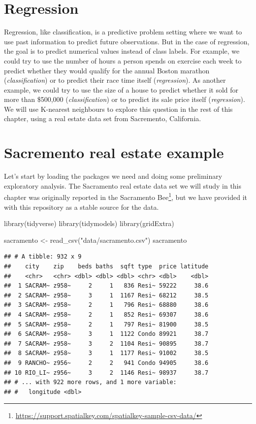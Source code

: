 \documentclass[
]{krantz}
\makeatletter
\newenvironment{Shaded}{\begin{snugshade}}{\end{snugshade}}
\newcommand{\FunctionTok}[1]{\textcolor[rgb]{0,0,0}{#1}}
\newcommand{\NormalTok}[1]{#1}
\newcommand{\OtherTok}[1]{\textcolor[rgb]{0.37,0.37,0.37}{#1}}
\newcommand{\StringTok}[1]{\textcolor[rgb]{0.5,0.5,0.5}{#1}}
\renewcommand{\href}[2]{#2\footnote{\url{#1}}}
\newenvironment{kframe}{%
\medskip{}
\setlength{\fboxsep}{.8em}
 \def\at@end@of@kframe{}%
 \ifinner\ifhmode%
  \def\at@end@of@kframe{\end{minipage}}%
  \begin{minipage}{\columnwidth}%
 \fi\fi%
 \def\FrameCommand##1{\hskip\@totalleftmargin \hskip-\fboxsep
 \colorbox{shadecolor}{##1}\hskip-\fboxsep
     \hskip-\linewidth \hskip-\@totalleftmargin \hskip\columnwidth}%
 \MakeFramed {\advance\hsize-\width
   \@totalleftmargin\z@ \linewidth\hsize
   \@setminipage}}%
 {\par\unskip\endMakeFramed%
 \at@end@of@kframe}
\renewenvironment{Shaded}{\begin{kframe}}{\end{kframe}}
\makeatother
\begin{document}
\hypertarget{regression}{%
\section{Regression}\label{regression}}

Regression, like classification, is a predictive problem setting where we want
to use past information to predict future observations. But in the case of
regression, the goal is to predict numerical values instead of class labels.
For example, we could try to use the number of hours a person spends on
exercise each week to predict whether they would qualify for the annual Boston
marathon (\emph{classification}) or to predict their race time itself
(\emph{regression}). As another example, we could try to use the size of a house to
predict whether it sold for more than \$500,000 (\emph{classification}) or to
predict its sale price itself (\emph{regression}). We will use K-nearest neighbours
to explore this question in the rest of this chapter, using a real estate data
set from Sacremento, California.

\hypertarget{sacremento-real-estate-example}{%
\section{Sacremento real estate example}\label{sacremento-real-estate-example}}

Let's start by loading the packages we need and doing some preliminary
exploratory analysis. The Sacramento real estate data set we will study in this chapter
was \href{https://support.spatialkey.com/spatialkey-sample-csv-data/}{originally reported in the Sacramento Bee},
but we have provided it with this repository as a stable source for the data.

\begin{Shaded}
\begin{Highlighting}[]
\FunctionTok{library}\NormalTok{(tidyverse)}
\FunctionTok{library}\NormalTok{(tidymodels)}
\FunctionTok{library}\NormalTok{(gridExtra)}

\NormalTok{sacramento }\OtherTok{\textless{}{-}} \FunctionTok{read\_csv}\NormalTok{(}\StringTok{"data/sacramento.csv"}\NormalTok{)}
\NormalTok{sacramento}
\end{Highlighting}
\end{Shaded}

\begin{verbatim}
## # A tibble: 932 x 9
##    city    zip    beds baths  sqft type  price latitude
##    <chr>   <chr> <dbl> <dbl> <dbl> <chr> <dbl>    <dbl>
##  1 SACRAM~ z958~     2     1   836 Resi~ 59222     38.6
##  2 SACRAM~ z958~     3     1  1167 Resi~ 68212     38.5
##  3 SACRAM~ z958~     2     1   796 Resi~ 68880     38.6
##  4 SACRAM~ z958~     2     1   852 Resi~ 69307     38.6
##  5 SACRAM~ z958~     2     1   797 Resi~ 81900     38.5
##  6 SACRAM~ z958~     3     1  1122 Condo 89921     38.7
##  7 SACRAM~ z958~     3     2  1104 Resi~ 90895     38.7
##  8 SACRAM~ z958~     3     1  1177 Resi~ 91002     38.5
##  9 RANCHO~ z956~     2     2   941 Condo 94905     38.6
## 10 RIO_LI~ z956~     3     2  1146 Resi~ 98937     38.7
## # ... with 922 more rows, and 1 more variable:
## #   longitude <dbl>
\end{verbatim}
\end{document}
